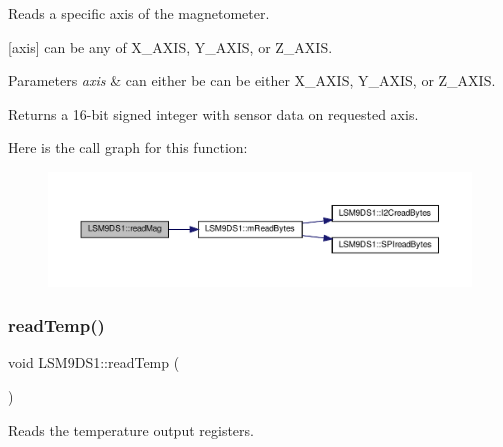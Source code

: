 Reads a specific axis of the magnetometer. 

\mbox{[}axis\mbox{]} can be any of X\+\_\+\+A\+X\+IS, Y\+\_\+\+A\+X\+IS, or Z\+\_\+\+A\+X\+IS.


\begin{DoxyParams}{Parameters}
{\em axis} & can either be can be either X\+\_\+\+A\+X\+IS, Y\+\_\+\+A\+X\+IS, or Z\+\_\+\+A\+X\+IS. \\
\hline
\end{DoxyParams}
\begin{DoxyReturn}{Returns}
a 16-\/bit signed integer with sensor data on requested axis. 
\end{DoxyReturn}
Here is the call graph for this function\+:
\nopagebreak
\begin{figure}[H]
\begin{center}
\leavevmode
\includegraphics[width=350pt]{classLSM9DS1_a615fd3ab32a9af833ef9899663100330_cgraph}
\end{center}
\end{figure}
\mbox{\label{classLSM9DS1_aca21a51dc79a1287b97ed9c326e2080b}} 
\subsubsection{\texorpdfstring{read\+Temp()}{readTemp()}}
{\footnotesize\ttfamily void L\+S\+M9\+D\+S1\+::read\+Temp (\begin{DoxyParamCaption}{ }\end{DoxyParamCaption})}



Reads the temperature output registers. 

